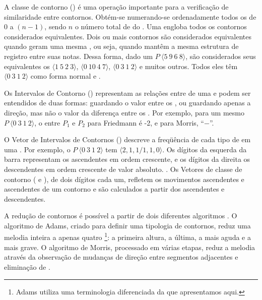 A classe de contorno () é uma operação importante para a
verificação de similaridade entre contornos. Obtém-se 
numerando-se ordenadamente todos os  de $0$ a $(n-1)$,
sendo $n$ o número total de  do . Uma 
engloba todos os contornos considerados equivalentes. Dois ou mais
contornos são considerados equivalentes quando geram uma mesma
, ou seja, quando mantêm a mesma estrutura de registro
entre suas notas. Dessa forma, dado um 
$P\:\langle5\:9\:6\:8\rangle$, são considerados seus equivalentes os
 $\langle1\:5\:2\:3\rangle$, $\langle0\:10\:4\:7\rangle$,
$\langle0\:3\:1\:2\rangle$ e muitos outros. Todos eles têm
$\langle0\:3\:1\:2\rangle$ como forma normal e .

Os Intervalos de Contorno () representam as relações entre
 de uma  e podem ser entendidos de duas formas:
guardando o valor entre os 
\cite{friedmann85:methodology}, ou guardando apenas a direção, mas não
o valor da diferença entre os 
\cite{morris93:directions}. Por exemplo, para um mesmo 
$P\:\langle0\:3\:1\:2\rangle$, o  entre $P_1$ e $P_2$ para
Friedmann é -2, e para Morris, ``$-$''.

O Vetor de Intervalos de Contornos () descreve a freqüência de
cada tipo de  em uma . Por exemplo, o 
$P\:\langle0\:3\:1\:2\rangle$ tem 
$\langle2,1,1/1,1,0\rangle$. Os dígitos da esquerda da barra
representam os  ascendentes em ordem crescente, e os dígitos da
direita os  descendentes em ordem crescente de valor
absoluto. \cite{friedmann85:methodology}. Os Vetores de classe de
contorno ( e ), de dois dígitos cada um, refletem
os movimentos ascendentes e ascendentes de um contorno e são
calculados a partir dos  ascendentes e descendentes.

A redução de contornos é possível a partir de dois diferentes
algoritmos \cite{adams76:melodic,morris93:directions}. O algoritmo de
Adams, criado para definir uma tipologia de contornos, reduz uma
melodia inteira a apenas quatro \footnote{Adams utiliza
  uma terminologia diferenciada da que apresentamos aqui.}: a primeira
altura, a última, a mais aguda e a mais grave. O algoritmo de Morris,
processado em várias etapas, reduz a melodia através da observação de
mudanças de direção entre segmentos adjacentes e eliminação de
.


